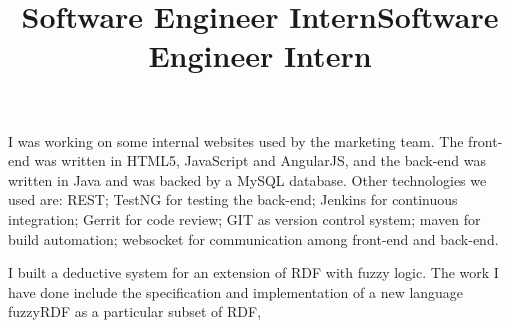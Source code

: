 \begin{resume}
        \title{Software Engineer Intern}
        \begin{position}
            I was working on some internal websites used by the marketing team.
            The front-end was written in HTML5, JavaScript and AngularJS, and
            the back-end was written in Java and was backed by a MySQL database.
            Other technologies we used are:
            REST;
            TestNG for testing the back-end;
            Jenkins for continuous integration;
            Gerrit for code review;
            GIT as version control system;
            maven for build automation;
            websocket for communication among front-end and back-end.
        \end{position}


        \title{Software Engineer Intern}
        \begin{position}
            I built a deductive system for an extension of RDF with fuzzy logic. %
            The work I have done include the specification and implementation of a new language fuzzyRDF as a particular subset of RDF,

        \end{position}




\end{resume}
